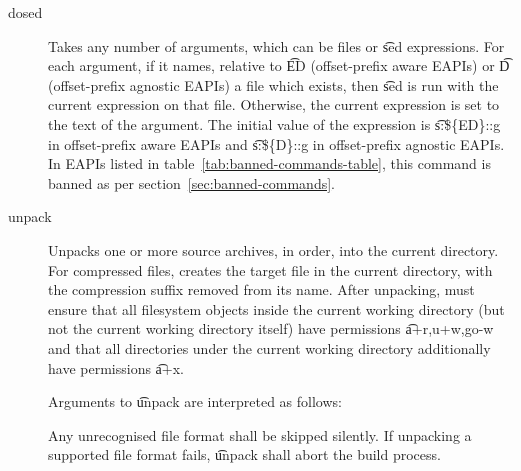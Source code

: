 \begin{description}
\item[dosed] Takes any number of arguments, which can be files or \t{sed} expressions. For each
    argument, if it names, relative to \t{ED} (offset-prefix aware EAPIs) or \t{D} (offset-prefix agnostic
    EAPIs) a file which exists, then \t{sed} is run with the current expression on that file. Otherwise,
    the current expression is set to the text of the argument. The initial value of the expression is
    \t{s:\$\{ED\}::g} in offset-prefix aware EAPIs and \t{s:\$\{D\}::g} in offset-prefix agnostic
    EAPIs. In EAPIs listed in table~\ref{tab:banned-commands-table}, this command is banned as per
    section~\ref{sec:banned-commands}.

\item[unpack] Unpacks one or more source archives, in order, into the current directory.
    For compressed files, creates the target file in the current directory, with the compression
    suffix removed from its name. After unpacking, must ensure that all filesystem objects inside
    the current working directory (but not the current working directory itself) have permissions
    \t{a+r,u+w,go-w} and that all directories under the current working directory additionally have
    permissions \t{a+x}.

    Arguments to \t{unpack} are interpreted as follows:

    Any unrecognised file format shall be skipped silently. If unpacking a supported file format
    fails, \t{unpack} shall abort the build process.


\end{description}
